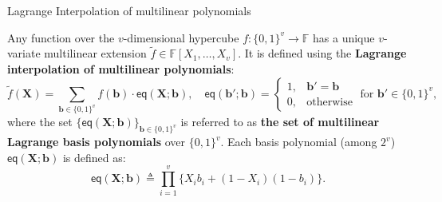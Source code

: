 \documentclass{zkdl-presentation-template}
\begin{document}
    \begin{frame}{Lagrange Interpolation of multilinear polynomials}
        \begin{theorem}
            Any function over the $v$-dimensional hypercube $f: \{0,1\}^v \to
            \mathbb{F}$ has a unique $v$-variate multilinear extension $\widetilde{f}
            \in \mathbb{F}[X_1,\dots,X_v]$. It is defined using the \textbf{Lagrange
            interpolation of multilinear polynomials}:
            \begin{equation*}
                \widetilde{f}(\mathbf{X}) = \sum_{\boldsymbol{b} \in \{0,1\}^v} f(\boldsymbol{b}) \cdot \mathsf{eq}(\mathbf{X};\boldsymbol{b}),
                \quad \mathsf{eq}(\boldsymbol{b}'; \boldsymbol{b}) = \begin{cases}
                    1, & \boldsymbol{b}' = \boldsymbol{b} \\
                    0, & \text{otherwise}
                \end{cases} \; \text{for } \boldsymbol{b}' \in \{0,1\}^v,
            \end{equation*}
            where the set $\{\mathsf{eq}(\mathbf{X};
            \boldsymbol{b})\}_{\boldsymbol{b} \in \{0,1\}^v}$ is referred to as
            \textbf{the set of multilinear Lagrange basis polynomials} over
            $\{0,1\}^v$. \pause Each basis polynomial (among $2^v$)
            $\mathsf{eq}(\mathbf{X};\boldsymbol{b})$ is defined as:
            \begin{equation*}
                \mathsf{eq}(\mathbf{X};\boldsymbol{b}) \triangleq \prod_{i=1}^v \{X_ib_i + (1-X_i)(1-b_i) \}.
            \end{equation*}
        \end{theorem}
    \end{frame}
\end{document}
